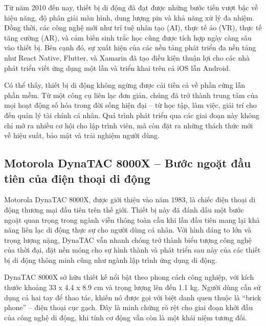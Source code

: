 \begin{flushleft}
  \hspace*{0.8cm}Từ năm 2010 đến nay, thiết bị di động đã đạt được những bước tiến vượt bậc về hiệu năng, độ phân giải màn hình, dung lượng pin và khả năng xử lý đa nhiệm. Đồng thời, các công nghệ mới như trí tuệ nhân tạo (AI), thực tế ảo (VR), thực tế tăng cường (AR), và cảm biến sinh trắc học cũng được tích hợp ngày càng sâu vào thiết bị. Bên cạnh đó, sự xuất hiện của các nền tảng phát triển đa nền tảng như React Native, Flutter, và Xamarin đã tạo điều kiện thuận lợi cho các nhà phát triển viết ứng dụng một lần và triển khai trên cả iOS lẫn Android.
\end{flushleft}

\begin{flushleft}
  \hspace*{0.8cm}Có thể thấy, thiết bị di động không ngừng được cải tiến cả về phần cứng lẫn phần mềm. Từ một công cụ liên lạc đơn giản, chúng đã trở thành trung tâm của mọi hoạt động số hóa trong đời sống hiện đại – từ học tập, làm việc, giải trí cho đến quản lý tài chính cá nhân. Quá trình phát triển qua các giai đoạn này không chỉ mở ra nhiều cơ hội cho lập trình viên, mà còn đặt ra những thách thức mới về hiệu suất, bảo mật và trải nghiệm người dùng.
\end{flushleft}

\subsection{Motorola DynaTAC 8000X – Bước ngoặt đầu tiên của điện thoại di động}
\renewcommand{\labelitemi}{--}    
\begin{flushleft}
    \hspace*{0.8cm}Motorola DynaTAC 8000X, được giới thiệu vào năm 1983, là chiếc điện thoại di động thương mại đầu tiên trên thế giới. Thiết bị này đã đánh dấu một bước ngoặt quan trọng trong ngành viễn thông toàn cầu khi lần đầu tiên mang lại khả năng liên lạc di động thực sự cho người dùng cá nhân. Với hình dáng to lớn và trọng lượng nặng, DynaTAC vẫn nhanh chóng trở thành biểu tượng công nghệ của thời đại, đặt nền móng cho sự hình thành và phát triển sau này của các thiết bị di động thông minh cũng như ngành lập trình ứng dụng di động.
\end{flushleft}

\begin{flushleft}
  \hspace*{0.8cm}DynaTAC 8000X sở hữu thiết kế nổi bật theo phong cách công nghiệp, với kích thước khoảng 33 x 4.4 x 8.9 cm và trọng lượng lên đến 1.1 kg. Người dùng cần sử dụng cả hai tay để thao tác, khiến nó được gọi với biệt danh quen thuộc là “brick phone” – điện thoại cục gạch. Đây là minh chứng rõ rệt cho giai đoạn khởi đầu của công nghệ di động, khi tính cơ động vẫn còn là một khái niệm tương đối.
\end{flushleft}

